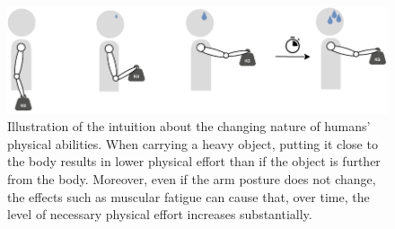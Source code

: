 

\begin{figure}[!h]
    \centering
    \includegraphics[width=\linewidth]{Chapters/imgs/baguette_carrying_fatigue.pdf}
    \caption{Illustration of the intuition about the changing nature of humans' physical abilities. When carrying a heavy object, putting it close to the body results in lower physical effort than if the object is further from the body. Moreover, even if the arm posture does not change, the effects such as muscular fatigue can cause that, over time, the level of necessary physical effort increases substantially. }
    \label{fig:baguette}
\end{figure}


